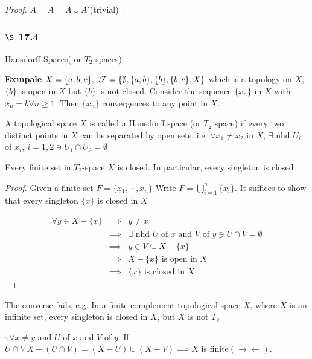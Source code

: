 \begin{proof}
	$A = \overline{A} = A \cup A'$(trivial)
\end{proof}

\subsubsection*{$\S$ 17.4} Hausdorff Spaces( or $T_2$-spaces)

\textbf{Exmpale} $X = \{a,b,c\},~\mathscr{T} = \{\emptyset,\{a,b\},\{b\},\{b,c\},X\}$ which is a topology on $X$, $\{b\}$ is open in $X$ but $\{b\}$ is not closed. Consider the sequence $\{x_n\}$ in $X$ with $x_n = b \forall n \geq 1$. Then $\{x_n\}$ convergences to any point in $X$.

\begin{defn}
	A topological space $X$ is called a Hausdorff space (or $T_2$ space) if every two distinct points in $X$ can be separated by open sets. i.e. $\forall x_1 \neq x_2$ in $X$, $\exists$ nhd $U_i$ of $x_i,~i = 1,2 \ni U_1 \cap U_2 = \emptyset$
\end{defn}

\begin{thm*}
	Every finite set in $T_2$-space $X$ is closed. In particular, every singleton is closed
\end{thm*}

\begin{proof}
	Given a finite set $F = \{x_1 ,\cdots,x_n\}$ Write $F = \bigcup_{i = 1}^n\{x_i\}$. It suffices to show that every singleton $\{x\}$ is closed in $X$
	
	\begin{eqnarray*}
		\forall y \in X-\{x\} &\implies& y \neq x\\
		&\implies & \exists \text{ nhd } U \text{ of } x \text{ and } V \text{ of } y \ni U \cap V = \emptyset\\
		&\implies & y \in V \subseteq X - \{x\}\\
		& \implies &X - \{x\} \text{ is open in } X\\
		& \implies &\{ x\} \text{ is closed in }X
	\end{eqnarray*}
\end{proof}

\begin{rmk*}
	The converse fails, e.g. In a finite complement topological space $X$, where $X$ is an infinite set, every singleton is closed in $X$, but $X$ is not $T_2$
	
	$\because \forall x \neq y$ and $U$ of $x$ and $V$ of $y$. If $U \cap V~X-(U \cap V) = (X - U) \cup (X - V) \implies X$ is finite$(\rightarrow\leftarrow)$.
\end{rmk*}

